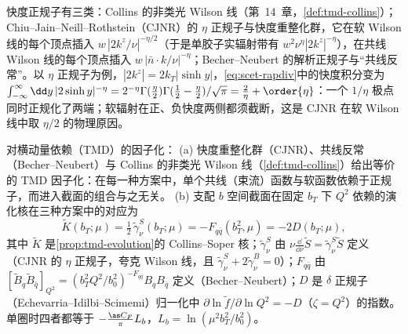 快度正规子有三类：Collins 的非类光 Wilson 线（第~14~章，\cref{def:tmd-collins}）；Chiu--Jain--Neill--Rothstein（CJNR）的 $\eta$ 正规子与快度重整化群\cite{ChiuEtAl2012a,ChiuEtAl2012b}，它在软 Wilson 线的每个顶点插入 $w\,|2k^z/\nu|^{-\eta/2}$（于是单胶子实辐射带有 $w^2\nu^\eta|2k^z|^{-\eta}$），在共线 Wilson 线的每个顶点插入 $w\,|\bar n\cdot k/\nu|^{-\eta}$；Becher--Neubert 的解析正规子与“共线反常”\cite{BecherNeubert2011}。以 $\eta$ 正规子为例，$|2k^z|=2k_T|\sinh y|$，\cref{eq:scet-rapdiv}中的快度积分变为
$\int_{-\infty}^{\infty}\dd y\,|2\sinh y|^{-\eta}=2^{-\eta}\Gamma(\tfrac\eta2)\Gamma(\tfrac12-\tfrac\eta2)/\sqrt\pi=\tfrac2\eta+\order{\eta}$：一个 $1/\eta$ 极点同时正规化了两端；软辐射在正、负快度两侧都须截断，这是 CJNR 在软 Wilson 线中取 $\eta/2$ 的物理原因\cite{ChiuEtAl2012a}。%

\begin{proposition}\label{prop:scet-rapidity-rg}
对横动量依赖（TMD）的因子化：
(a) 快度重整化群（CJNR）、共线反常（Becher--Neubert）与 Collins 的非类光 Wilson 线（\cref{def:tmd-collins}）给出等价的 TMD 因子化\cite{Collins:2017oxh}：在每一种方案中，单个共线（束流）函数与软函数依赖于正规子，而进入截面的组合与之无关。
(b) 支配 $b$ 空间截面在固定 $b_T$ 下 $Q^2$ 依赖的演化核在三种方案中的对应为
\begin{equation}\label{eq:scet-kernels}
\tilde K(b_T;\mu)=\tfrac12\,\tilde\gamma_\nu^S(b_T;\mu)=-F_{q\bar q}(b_T^2,\mu)=-2D(b_T;\mu),
\end{equation}
其中 $\tilde K$ 是\cref{prop:tmd-evolution}的 Collins--Soper 核；$\tilde\gamma_\nu^S$ 由 $\nu\frac{\dd}{\dd\nu}\tilde S=\tilde\gamma^S_\nu\tilde S$ 定义（CJNR 的 $\eta$ 正规子，夸克 Wilson 线，且 $\tilde\gamma^S_\nu+2\tilde\gamma^B_\nu=0$）；$F_{q\bar q}$ 由 $[\tilde B_{q}\tilde B_{\bar q}]_{Q^2}=(b_T^2Q^2/b_0^2)^{-F_{q\bar q}}B_qB_{\bar q}$ 定义（Becher--Neubert）；$D$ 是 $\delta$ 正规子（Echevarria--Idilbi--Scimemi）归一化中 $\partial\ln\tilde f/\partial\ln Q^2=-D$（$\zeta=Q^2$）的指数\cite{EchevarriaIdilbiScimemi2012}。单圈时四者都等于 $-\frac{\as C_F}{\pi}L_b$，$L_b=\ln(\mu^2b_T^2/b_0^2)$。
\end{proposition}

